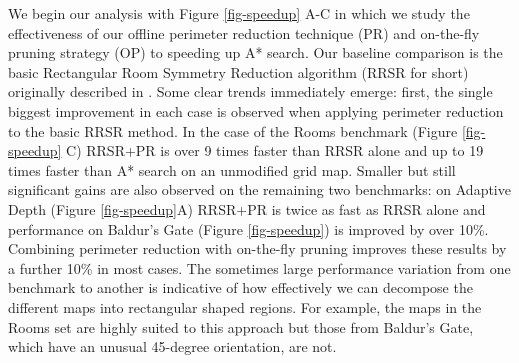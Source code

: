 We begin our analysis with Figure \ref{fig-speedup} A-C in which we study the 
effectiveness of our offline perimeter reduction technique (PR) and on-the-fly 
pruning strategy (OP) to speeding up A* search. 
Our baseline comparison is the basic Rectangular Room Symmetry Reduction algorithm 
(RRSR for short) originally described in \cite{harabor10}.
Some clear trends immediately emerge: first, the single biggest improvement in each
case is observed when applying perimeter reduction to the basic RRSR method.
In the case of the Rooms benchmark (Figure \ref{fig-speedup} C) RRSR+PR is over 9
times faster than RRSR alone and up to 19 times faster than A* search on an unmodified
grid map.
Smaller but still significant gains are also observed on the remaining two benchmarks:
on Adaptive Depth (Figure \ref{fig-speedup}A) RRSR+PR is twice as fast as RRSR alone
and performance on Baldur's Gate (Figure \ref{fig-speedup}) is improved by over 10\%.
Combining perimeter reduction with on-the-fly pruning improves these results by a further
10\% in most cases.
The sometimes large performance variation from one benchmark to another is indicative
of how effectively we can decompose the different maps into rectangular shaped regions.
For example, the maps in the Rooms set are highly suited to this approach but those
from Baldur's Gate, which have an unusual 45-degree orientation, are not.
